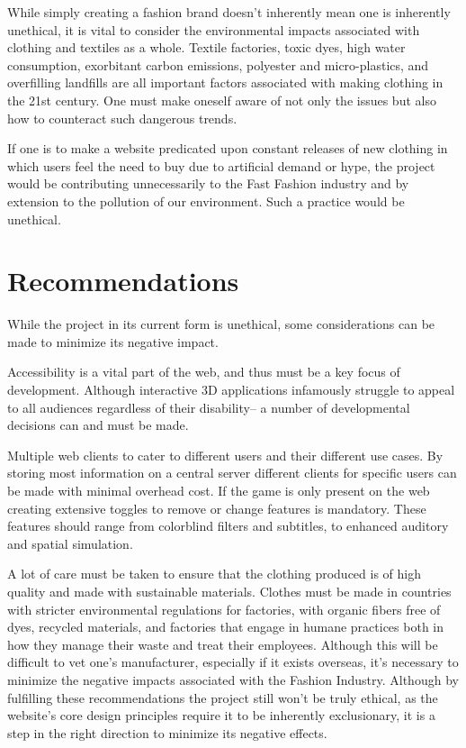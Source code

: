 \documentclass[10pt,twocolumn]{article}
\begin{document}
While simply creating a fashion brand doesn’t inherently mean one is inherently unethical, it is vital to consider the environmental impacts associated with clothing and textiles as a whole. Textile factories, toxic dyes, high water consumption, exorbitant carbon emissions, polyester and micro-plastics, and overfilling landfills are all important factors associated with making clothing in the 21st century. One must make oneself aware of not only the issues but also how to counteract such dangerous trends.

If one is to make a website predicated upon constant releases of new clothing in which users feel the need to buy due to artificial demand or hype, the project would be contributing unnecessarily to the Fast Fashion industry and by extension to the pollution of our environment. Such a practice would be unethical.


\section{Recommendations}

While the project in its current form is unethical, some considerations can be made to minimize its negative impact.

Accessibility is a vital part of the web, and thus must be a key focus of development. Although interactive 3D applications infamously struggle to appeal to all audiences regardless of their disability– a number of developmental decisions can and must be made.

Multiple web clients to cater to different users and their different use cases. By storing most information on a central server different clients for specific users can be made with minimal overhead cost. If the game is only present on the web creating extensive toggles to remove or change features is mandatory. These features should range from colorblind filters and subtitles, to enhanced auditory and spatial simulation.

A lot of care must be taken to ensure that the clothing produced is of high quality and made with sustainable materials. Clothes must be made in countries with stricter environmental regulations for factories, with organic fibers free of dyes, recycled materials, and factories that engage in humane practices both in how they manage their waste and treat their employees. Although this will be difficult to vet one’s manufacturer, especially if it exists overseas, it’s necessary to minimize the negative impacts associated with the Fashion Industry.
Although by fulfilling these recommendations the project still won’t be truly ethical, as the website’s core design principles require it to be inherently exclusionary, it is a step in the right direction to minimize its negative effects.

\printbibliography 
\end{document}
